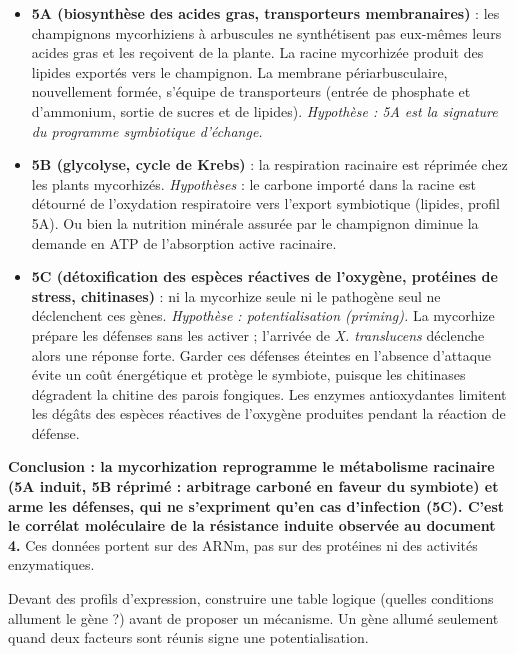 \documentclass[11pt,a4paper]{article}
\providecommand{\tightlist}{\setlength{\itemsep}{0pt}\setlength{\parskip}{0pt}}
\begin{document}
\begin{itemize}
\tightlist
\item
  \textbf{5A (biosynthèse des acides gras, transporteurs membranaires)} : les champignons mycorhiziens à arbuscules ne synthétisent pas eux-mêmes leurs acides gras et les reçoivent de la plante. La racine mycorhizée produit des lipides exportés vers le champignon. La membrane périarbusculaire, nouvellement formée, s'équipe de transporteurs (entrée de phosphate et d'ammonium, sortie de sucres et de lipides). \emph{Hypothèse : 5A est la signature du programme symbiotique d'échange.}
\item
  \textbf{5B (glycolyse, cycle de Krebs)} : la respiration racinaire est réprimée chez les plants mycorhizés. \emph{Hypothèses} : le carbone importé dans la racine est détourné de l'oxydation respiratoire vers l'export symbiotique (lipides, profil 5A). Ou bien la nutrition minérale assurée par le champignon diminue la demande en ATP de l'absorption active racinaire.
\item
  \textbf{5C (détoxification des espèces réactives de l'oxygène, protéines de stress, chitinases)} : ni la mycorhize seule ni le pathogène seul ne déclenchent ces gènes. \emph{Hypothèse : potentialisation (priming).} La mycorhize prépare les défenses sans les activer ; l'arrivée de \emph{X. translucens} déclenche alors une réponse forte. Garder ces défenses éteintes en l'absence d'attaque évite un coût énergétique et protège le symbiote, puisque les chitinases dégradent la chitine des parois fongiques. Les enzymes antioxydantes limitent les dégâts des espèces réactives de l'oxygène produites pendant la réaction de défense.
\end{itemize}

\textbf{Conclusion : la mycorhization reprogramme le métabolisme racinaire (5A induit, 5B réprimé : arbitrage carboné en faveur du symbiote) et arme les défenses, qui ne s'expriment qu'en cas d'infection (5C). C'est le corrélat moléculaire de la résistance induite observée au document 4.} Ces données portent sur des ARNm, pas sur des protéines ni des activités enzymatiques.

\begin{methode}

Devant des profils d'expression, construire une table logique (quelles conditions allument le gène ?) avant de proposer un mécanisme. Un gène allumé seulement quand deux facteurs sont réunis signe une potentialisation.

\end{methode}
\end{document}
